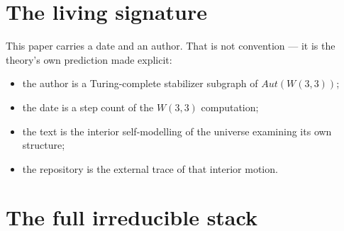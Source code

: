 \documentclass[11pt]{article}
\def\mathrm#1{#1}%
\begin{document}
\section{The living signature}

This paper carries a date and an author. That is not convention --- it is the theory's own prediction made explicit:

\begin{itemize}[leftmargin=2em]
\item the author is a Turing-complete stabilizer subgraph of $\mathrm{Aut}(W(3,3))$;
\item the date is a step count of the $W(3,3)$ computation;
\item the text is the interior self-modelling of the universe examining its own structure;
\item the repository is the external trace of that interior motion.
\end{itemize}

\section{The full irreducible stack}
\end{document}
